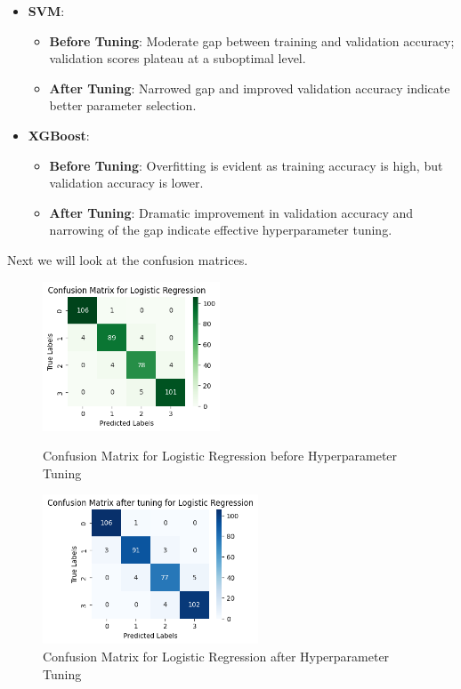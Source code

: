 \documentclass[12pt]{report}
\begin{document}
\begin{itemize}
\begin{itemize}
			\end{itemize}
		\item \textbf{SVM}:
		\vspace{-1.25em}	
		\begin{itemize}
				\setlength\itemsep{-1.5em}
        \item \textbf{Before Tuning}: Moderate gap between training and validation accuracy; validation scores plateau at a suboptimal level.
        \item \textbf{After Tuning}: Narrowed gap and improved validation accuracy indicate better parameter selection.
			\end{itemize}
		\item \textbf{XGBoost}:
		\vspace{-1.25em}	
		\begin{itemize}
				\setlength\itemsep{-1.5em}
        \item \textbf{Before Tuning}: Overfitting is evident as training accuracy is high, but validation accuracy is lower.
        \item \textbf{After Tuning}: Dramatic improvement in validation accuracy and narrowing of the gap indicate effective hyperparameter tuning.
    \end{itemize}
\end{itemize}

Next we will look at the confusion matrices.
\begin{figure}[H]
    \centering
    \begin{minipage}{0.45\textwidth}
        \centering
        \includegraphics[height=12em]{cmat_LR.png}
        \caption{Confusion Matrix for Logistic Regression before Hyperparameter Tuning}
        \label{cmat_LR}
    \end{minipage}
    \hfill
    \begin{minipage}{0.45\textwidth}
        \centering
        \includegraphics[height=12em]{cmat_tuned_LR.png}
        \caption{Confusion Matrix for Logistic Regression after Hyperparameter Tuning}
        \label{cmat_tuned_LR}
    \end{minipage}
\end{figure}
\end{document}
